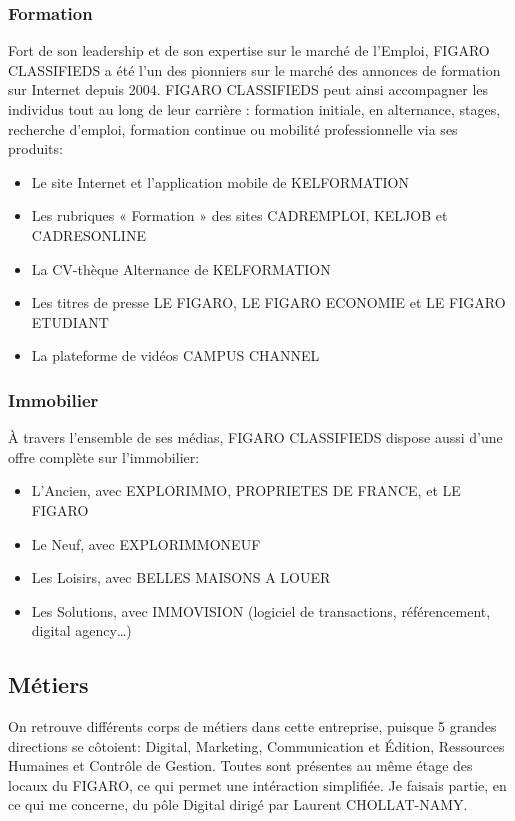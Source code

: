 \subsubsection{Formation}
Fort de son leadership et de son expertise sur le marché de l'Emploi, FIGARO CLASSIFIEDS a été l'un des pionniers sur le marché des annonces de formation sur Internet depuis 2004.
FIGARO CLASSIFIEDS peut ainsi accompagner les individus tout au long de leur carrière : formation initiale, en alternance, stages, recherche d'emploi, formation continue ou mobilité professionnelle via ses produits:
\begin{itemize}
  \item Le site Internet et l'application mobile de KELFORMATION
  \item Les rubriques « Formation » des sites CADREMPLOI, KELJOB et CADRESONLINE
  \item La CV-thèque Alternance de KELFORMATION
  \item Les titres de presse LE FIGARO, LE FIGARO ECONOMIE et LE FIGARO ETUDIANT
  \item La plateforme de vidéos CAMPUS CHANNEL
\end{itemize}
\subsubsection{Immobilier}
À travers l'ensemble de ses médias, FIGARO CLASSIFIEDS dispose aussi d’une offre complète sur l’immobilier:
\begin{itemize}
  \item L’Ancien, avec EXPLORIMMO, PROPRIETES DE FRANCE, et LE FIGARO
  \item Le Neuf, avec EXPLORIMMONEUF
  \item Les Loisirs, avec BELLES MAISONS A LOUER
  \item Les Solutions, avec IMMOVISION (logiciel de transactions, référencement, digital agency…)
\end{itemize}

\subsection{Métiers}
On retrouve différents corps de métiers dans cette entreprise, puisque 5 grandes directions se côtoient:  Digital, Marketing, Communication et Édition, Ressources Humaines et Contrôle de Gestion.
Toutes sont présentes au même étage des locaux du FIGARO, ce qui permet une intéraction simplifiée.
Je faisais partie, en ce qui me concerne, du pôle Digital dirigé par Laurent CHOLLAT-NAMY.

